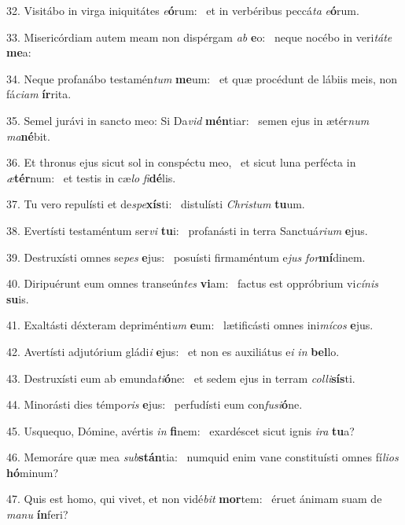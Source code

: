 32. Visitábo in virga iniquitátes \textit{e}\textbf{ó}rum: \ast\  et in verbéribus peccá\textit{ta} \textit{e}\textbf{ó}rum.\

33. Misericórdiam autem meam non dispérgam \textit{ab} \textbf{e}o: \ast\  neque nocébo in veri\textit{tá}\textit{te} \textbf{me}a:\

34. Neque profanábo testamén\textit{tum} \textbf{me}um: \ast\  et quæ procédunt de lábiis meis, non fá\textit{ci}\textit{am} \textbf{ír}rita.\

35. Semel jurávi in sancto meo: Si Da\textit{vid} \textbf{mén}tiar: \ast\  semen ejus in ætér\textit{num} \textit{ma}\textbf{né}bit.\

36. Et thronus ejus sicut sol in conspéctu meo, \dag\  et sicut luna perfécta in \textit{æ}\textbf{tér}num: \ast\  et testis in cæ\textit{lo} \textit{fi}\textbf{dé}lis.\

37. Tu vero repulísti et de\textit{spe}\textbf{xís}ti: \ast\  distulísti \textit{Chris}\textit{tum} \textbf{tu}um.\

38. Evertísti testaméntum ser\textit{vi} \textbf{tu}i: \ast\  profanásti in terra Sanctuá\textit{ri}\textit{um} \textbf{e}jus.\

39. Destruxísti omnes se\textit{pes} \textbf{e}jus: \ast\  posuísti firmaméntum e\textit{jus} \textit{for}\textbf{mí}dinem.\

40. Diripuérunt eum omnes transeún\textit{tes} \textbf{vi}am: \ast\  factus est oppróbrium vi\textit{cí}\textit{nis} \textbf{su}is.\

41. Exaltásti déxteram depriménti\textit{um} \textbf{e}um: \ast\  lætificásti omnes ini\textit{mí}\textit{cos} \textbf{e}jus.\

42. Avertísti adjutórium gládi\textit{i} \textbf{e}jus: \ast\  et non es auxiliátus e\textit{i} \textit{in} \textbf{bel}lo.\

43. Destruxísti eum ab emunda\textit{ti}\textbf{ó}ne: \ast\  et sedem ejus in terram \textit{col}\textit{li}\textbf{sís}ti.\

44. Minorásti dies témpo\textit{ris} \textbf{e}jus: \ast\  perfudísti eum con\textit{fu}\textit{si}\textbf{ó}ne.\

45. Usquequo, Dómine, avértis \textit{in} \textbf{fi}nem: \ast\  exardéscet sicut ignis \textit{i}\textit{ra} \textbf{tu}a?\

46. Memoráre quæ mea \textit{sub}\textbf{stán}tia: \ast\  numquid enim vane constituísti omnes fí\textit{li}\textit{os} \textbf{hó}minum?\

47. Quis est homo, qui vivet, et non vidé\textit{bit} \textbf{mor}tem: \ast\  éruet ánimam suam de \textit{ma}\textit{nu} \textbf{ín}feri?\

